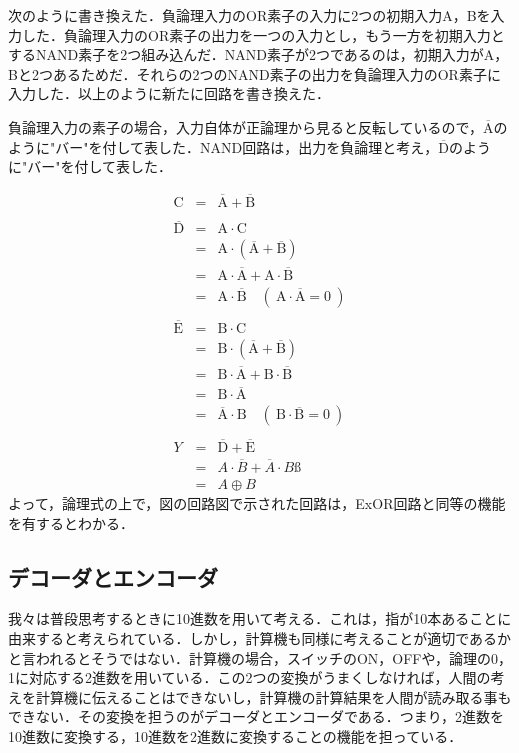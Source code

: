 次のように書き換えた．負論理入力のOR素子の入力に2つの初期入力A，Bを入力した．負論理入力のOR素子の出力を一つの入力とし，もう一方を初期入力とするNAND素子を2つ組み込んだ．NAND素子が2つであるのは，初期入力がA，Bと2つあるためだ．それらの2つのNAND素子の出力を負論理入力のOR素子に入力した．以上のように新たに回路を書き換えた．

負論理入力の素子の場合，入力自体が正論理から見ると反転しているので，$\overline{\mathrm{A}}$のように"バー"を付して表した．NAND回路は，出力を負論理と考え，$\overline{\mathrm{D}}$のように"バー"を付して表した．

\begin{eqnarray}
	\mathrm{C} &=& \overline{\mathrm{A}} + \overline{\mathrm{B}} \nonumber \\
	&&\nonumber \\
	\overline{\mathrm{D}} &=& \mathrm{A} \cdot \mathrm{C} \nonumber \\
	&=& \mathrm{A} \cdot ( \overline{\mathrm{A}} + \overline{\mathrm{B}} ) \nonumber \\
	&=& \mathrm{A} \cdot \overline{ \mathrm{A}} + \mathrm{A} \cdot \overline{\mathrm{B}} \nonumber \\
	&=& \mathrm{A} \cdot \overline{\mathrm{B}} \quad
	\left(~\mathrm{A} \cdot \overline{\mathrm{A}} = 0 ~\right) \nonumber \\
	&&\nonumber \\
	\overline{\mathrm{E}} &=& \mathrm{B} \cdot \mathrm{C} \nonumber \\
	&=& \mathrm{B} \cdot ( \overline{\mathrm{A}} + \overline{\mathrm{B}} ) \nonumber \\
	&=& \mathrm{B} \cdot \overline{ \mathrm{A}} + \mathrm{B} \cdot \overline{\mathrm{B}} \nonumber \\
	&=& \mathrm{B} \cdot \overline{\mathrm{A}} \nonumber \\
	&=& \overline{ \mathrm{A}} \cdot \mathrm{B} \quad
	\left(~\mathrm{B} \cdot \overline{\mathrm{B}} = 0 ~\right) \nonumber \\
	&&\nonumber \\
	Y&=&\overline{\mathrm{D}} + \overline{\mathrm{E}} \nonumber \\
	&=& A \cdot \overline{B} + \overline{A} \cdot B ß\nonumber \\
	&=& A\oplus B \nonumber 
\end{eqnarray}
よって，論理式の上で，図の回路図で示された回路は，ExOR回路と同等の機能を有するとわかる．

%
%
%
\subsection{デコーダとエンコーダ}
\label{experiment_decoderencoder}
我々は普段思考するときに10進数を用いて考える．これは，指が10本あることに由来すると考えられている．しかし，計算機も同様に考えることが適切であるかと言われるとそうではない．計算機の場合，スイッチのON，OFFや，論理の0，1に対応する2進数を用いている．この2つの変換がうまくしなければ，人間の考えを計算機に伝えることはできないし，計算機の計算結果を人間が読み取る事もできない．その変換を担うのがデコーダとエンコーダである．つまり，2進数を10進数に変換する，10進数を2進数に変換することの機能を担っている．

